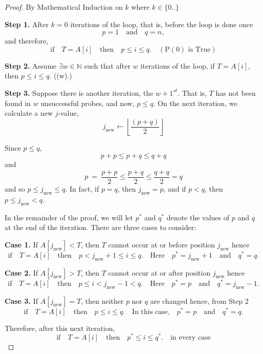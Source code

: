     \begin{proof}
        By Mathematical Induction on \(k\) where \(k \in \{0..\}\)

\textbf{Step 1.} After \(k = 0\) iterations of the loop, that is, before the loop is done once
\[ p = 1 \quad \text{and} \quad q = n, \]
and therefore,
\[ \text{if} \quad T = A[i] \quad \text{then} \quad p \leq i \leq q. \quad (\text{P}(0) \text{ is True}) \]

\textbf{Step 2.} Assume \(\exists w \in \mathbb{N}\) such that
after \(w\) iterations of the loop, if \( T = A[i] \), then \( p \leq i \leq q \). \quad ((w).)

\textbf{Step 3.} Suppose there is another iteration, the \( w + 1^{st} \).
That is, \( T \) has not been found in \( w \) unsuccessful probes, and now, \( p \leq q \).
On the next iteration, we calculate a new \( j \)-value,
\[ j_{\text{new}} \leftarrow \left\lfloor \frac{(p + q)}{2} \right\rfloor \]

Since \( p \leq q \),
\[ p + p \leq p + q \leq q + q \]
and
$$p\ =\ \frac{p+p}{2} \leq \frac{p+q}{2} \leq \frac{q+q}{2} =q$$
and so \( p \leq j_{\text{new}} \leq q \).
In fact, if \( p = q \), then \( j_{\text{new}} = p \), and if \( p < q \), then \( p \leq j_{\text{new}} < q \).

In the remainder of the proof, we will let \( p^* \) and \( q^* \) denote the values of \( p \) and \( q \) at the end of the iteration. There are three cases to consider:

\textbf{Case 1.} If \( A[j_{\text{new}}] < T \), then \( T \) cannot occur at or before position \( j_{\text{new}} \) hence
\[ \text{if} \quad T = A[i] \quad \text{then} \quad p < j_{\text{new}} + 1 \leq i \leq q. \quad \text{Here} \quad p^* = j_{\text{new}} + 1 \quad \text{and} \quad q^* = q. \]

\textbf{Case 2.} If \( A[j_{\text{new}}] > T \), then \( T \) cannot occur at or after position \( j_{\text{new}} \) hence
\[ \text{if} \quad T = A[i] \quad \text{then} \quad p \leq i < j_{\text{new}} - 1 < q. \quad \text{Here} \quad p^* = p \quad \text{and} \quad q^* = j_{\text{new}} - 1. \]

\textbf{Case 3.} If \( A[j_{\text{new}}] = T \), then neither \( p \) nor \( q \) are changed hence, from Step 2
\[ \text{if} \quad T = A[i] \quad \text{then} \quad p \leq i \leq q. \quad \text{In this case,} \quad p^* = p \quad \text{and} \quad q^* = q. \]

Therefore, after this next iteration,
\[ \text{if} \quad T = A[i] \quad \text{then} \quad p^* \leq i \leq q^*. \quad \text{in every case} \]
    \end{proof}
